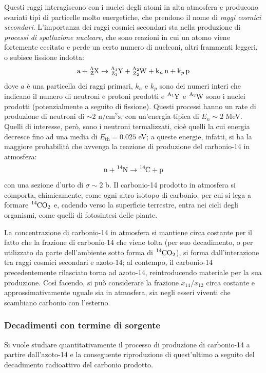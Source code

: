 \documentclass[11pt, a4paper]{scrartcl}
\theoremstyle{style}
\numberwithin{equation}{subsection}
\begin{document}
Questi raggi interagiscono con i nuclei degli atomi in alta atmosfera e producono svariati tipi di particelle molto energetiche, che prendono il nome di \textit{raggi cosmici secondari}.
L'importanza dei raggi cosmici secondari sta nella produzione di \textit{processi di spallazione nucleare}, che sono reazioni in cui un atomo viene fortemente eccitato e perde un certo numero di nucleoni, altri frammenti leggeri, o subisce fissione indotta:
\[
	\ce{a + ^{A}_{Z}X} \to \ce{^{A_1}_{Z_1}Y + ^{A_2}_{Z_2}W + k_n n + k_p p}
\] 
dove $a$ \`e una particella dei raggi primari, $k_n$ e $k_p$ sono dei numeri interi che indicano il numero di neutroni e protoni prodotti e $\ce{^{A_1}Y}$ e $\ce{^{A_2}W}$ sono i nuclei prodotti (potenzialmente a seguito di fissione).
Questi processi hanno un rate di produzione di neutroni di $\sim 2 \text{ n}/\text{cm}^2\text{s}$, con un'energia tipica di $E_n \sim 2$ MeV.
Quelli di interesse, per\`o, sono i neutroni termalizzati, cio\`e quelli la cui energia decresce fino ad una media di $E_\text{th} = 0.025$ eV; a queste energie, infatti, si ha la maggiore probabilit\`a che avvenga la reazione di produzione del carbonio-14 in atmosfera:
\[
	\ce{n + ^{14}N} \to  \ce{^{14}C + p}
\] 
con una sezione d'urto di $\sigma \sim 2$ b.
Il carbonio-14 prodotto in atmosfera si comporta, chimicamente, come ogni altro isotopo di carbonio, per cui si lega a formare $\ce{^{14}CO_2}$ e, cadendo verso la superficie terrestre, entra nei cicli degli organismi, come quelli di fotosintesi delle piante.

La concentrazione di carbonio-14 in atmosfera si mantiene circa costante per il fatto che la frazione di carbonio-14 che viene tolta (per suo decadimento, o per utilizzato da parte dell'ambiente sotto forma di $\ce{^{14}CO_2}$), si forma dall'interazione tra raggi cosmici secondari e azoto-14; al contempo, il carbonio-14 precedentemente rilasciato torna ad azoto-14, reintroducendo materiale per la sua produzione.
Cos\`i facendo, si pu\`o considerare la frazione $x_{14} / x_{12}$ circa costante e approssimativamente uguale sia in atmosfera, sia negli esseri viventi che scambiano carbonio con l'esterno.

\subsubsection{Decadimenti con termine di sorgente}
Si vuole studiare quantitativamente il processo di produzione di carbonio-14 a partire dall'azoto-14 e la conseguente riproduzione di quest'ultimo a seguito del decadimento radioattivo del carbonio prodotto.
\end{document}
